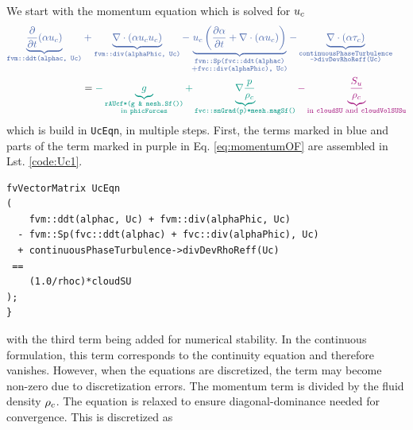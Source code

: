 We start with the momentum equation which is solved for $u_c$
\begin{equation}
\begin{aligned}
\label{eq:momentumOF}
    \color{kit-blue}
    \underbrace{\dfrac{\partial}{\partial \tvar} (\fvf  \uf )}_{\texttt{fvm::ddt(alphac, Uc)}} & \color{kit-blue}+ \underbrace{\nabla \cdot (\fvf \uf \uf)}_{\texttt{fvm::div(alphaPhic, Uc)}} - \underbrace{\uf \left( \dfrac{\partial \fvf}{\partial \tvar} + \nabla \cdot (\fvf \uf) \right)}_{\substack{\texttt{fvm::Sp(fvc::ddt(alphac)} \\ + \texttt{fvc::div(alphaPhic), Uc)}}} - \underbrace{\nabla \cdot (\fvf \ss_c)}_{\substack{\texttt{continuousPhaseTurbulence} \\ \texttt{->divDevRhoReff(Uc)}}} \\ 
    & = \color{kit-green}
    - \underbrace{g}_{\substack{\texttt{rAUcf*(g \& mesh.Sf())} \\ \text{in } \texttt{phicForces}}} +  \underbrace{\nabla \dfrac{\p}{\rf}}_{\texttt{fvc::snGrad(p)*mesh.magSf()}}
    \color{kit-purple}-  \underbrace{\dfrac{S_u}{\rf}}_{\text{in } \texttt{cloudSU} \text{ and } \texttt{cloudVolSUSu}}
\end{aligned}
\end{equation}
which is build in \lstinline|UcEqn|, in multiple steps.
First, the terms marked in blue and parts of the term marked in purple in Eq. \eqref{eq:momentumOF} are assembled in Lst. \ref{code:Uc1}.
\begin{lstlisting}[caption=\texttt{UcEqn.C}, label={code:Uc1}]
    fvVectorMatrix UcEqn
(
    fvm::ddt(alphac, Uc) + fvm::div(alphaPhic, Uc)
  - fvm::Sp(fvc::ddt(alphac) + fvc::div(alphaPhic), Uc)
  + continuousPhaseTurbulence->divDevRhoReff(Uc)
 ==
    (1.0/rhoc)*cloudSU
);
}
\end{lstlisting}
with the third term being added for numerical stability.
In the continuous formulation, this term corresponds to the continuity equation and therefore vanishes. However, when the equations are discretized, the term may become non-zero due to discretization errors.
The momentum term is divided by the fluid density $\rho_c$. 
The equation is relaxed to ensure diagonal-dominance needed for convergence. This is discretized as
